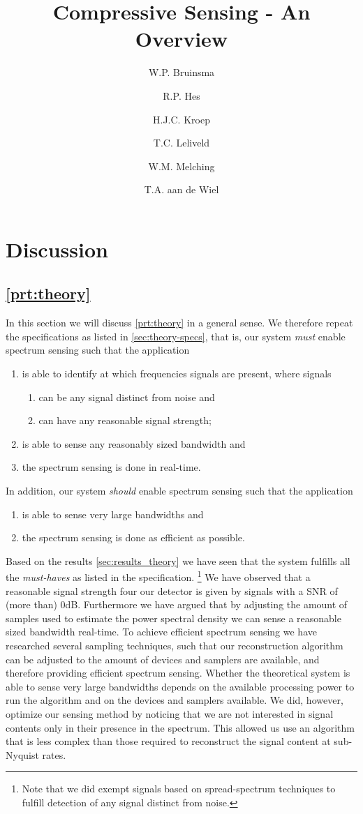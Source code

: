 \documentclass[a4paper, openany, oneside]{memoir}
\title{Compressive Sensing - An Overview}
\author{W.P. Bruinsma \and R.P. Hes \and H.J.C. Kroep \and T.C. Leliveld \and W.M. Melching \and T.A. aan de Wiel}
\begin{document}
\chapter{Discussion}

\section{\cref{prt:theory}}
In this section we will discuss \cref{prt:theory} in a general sense. We therefore repeat the specifications as listed
in \cref{sec:theory-specs}, that is, our system \emph{must} enable spectrum sensing such that the application
\begin{enumerate}
    \item is able to identify at which frequencies signals are present, where signals
    \begin{enumerate}
        \item can be any signal distinct from noise and
        \item can have any reasonable signal strength;
    \end{enumerate}
    \item is able to sense any reasonably sized bandwidth and
    \item the spectrum sensing is done in real-time.
\end{enumerate}
In addition, our system \emph{should} enable spectrum sensing such that the application
\begin{enumerate}
    \item is able to sense very large bandwidths and
    \item the spectrum sensing is done as efficient as possible.
\end{enumerate}

Based on the results \cref{sec:results_theory} we have seen that the system fulfills all the \emph{must-haves} as listed 
in the specification. \footnote{Note that we did exempt signals based on spread-spectrum techniques to fulfill detection of any signal distinct
from noise.} We have observed that a reasonable signal strength four our detector is given by signals with a SNR of (more than) 0dB. Furthermore we have argued that by adjusting the amount of samples used to estimate the power spectral density we can sense a reasonable sized bandwidth real-time. To achieve efficient spectrum sensing we have researched several sampling techniques, such that our reconstruction algorithm can
be adjusted to the amount of devices and samplers are available, and therefore providing efficient spectrum sensing. Whether the theoretical system is able to sense very large bandwidths depends on the available processing power to run the algorithm and on the devices and samplers available. We did, however, optimize our sensing method by noticing that we are not interested in signal contents only in their presence in the spectrum. This allowed us use an algorithm that is less complex than those required to reconstruct the signal content at sub-Nyquist rates.
\end{document}
